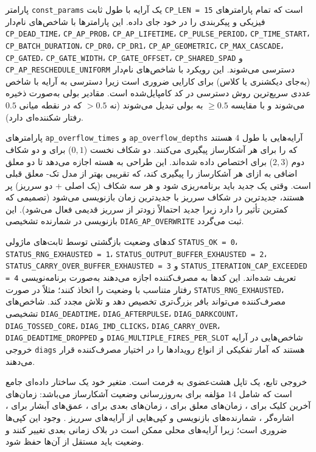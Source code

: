 پارامتر \texttt{const\_params} یک آرایه  با طول ثابت \texttt{CP\_LEN = 15} است که تمام پارامترهای فیزیکی و پیکربندی را در خود جای داده. این پارامترها با شاخص‌های نام‌دار \texttt{CP\_DEAD\_TIME}، \texttt{CP\_AP\_PROB}، \texttt{CP\_AP\_LIFETIME}، \texttt{CP\_PULSE\_PERIOD}، \texttt{CP\_TIME\_START}، \texttt{CP\_BATCH\_DURATION}، \texttt{CP\_DR0}، \texttt{CP\_DR1}، \texttt{CP\_AP\_GEOMETRIC}، \texttt{CP\_MAX\_CASCADE}، \texttt{CP\_GATED}، \texttt{CP\_GATE\_WIDTH}، \texttt{CP\_GATE\_OFFSET}، \texttt{CP\_SHARED\_SPAD} و \texttt{CP\_AP\_RESCHEDULE\_UNIFORM} دسترسی می‌شوند. این رویکرد با شاخص‌های نام‌دار (به‌جای دیکشنری یا کلاس) برای کارایی  ضروری است زیرا دسترسی به آرایه با شاخص عددی سریع‌ترین روش دسترسی در کد کامپایل‌شده است. مقادیر بولی به‌صورت  ذخیره می‌شوند و با مقایسه $\geq 0.5$ به بولی تبدیل می‌شوند (نه $> 0.5$ که در نقطه میانی $0.5$ رفتار شکننده‌ای دارد).

پارامترهای \texttt{ap\_overflow\_times} و \texttt{ap\_overflow\_depths} آرایه‌هایی با طول $4$ هستند که  را برای هر آشکارساز پیگیری می‌کنند. دو شکاف نخست ($0, 1$) برای  و دو شکاف دوم ($2, 3$) برای  اختصاص داده شده‌اند. این طراحی به هسته اجازه می‌دهد تا دو  معلق اضافی به ازای هر آشکارساز را پیگیری کند، که تقریبی بهتر از مدل تک- معلق قبلی است. وقتی یک  جدید باید برنامه‌ریزی شود و هر سه شکاف (یک اصلی + دو سرریز) پر هستند، جدیدترین  در شکاف سرریز با جدیدترین زمان بازنویسی می‌شود (تصمیمی که کمترین تأثیر را دارد زیرا  جدید احتمالاً زودتر از  سرریز قدیمی فعال می‌شود). این بازنویسی در شمارنده تشخیصی \texttt{DIAG\_AP\_OVERWRITE} ثبت می‌گردد.

کدهای وضعیت بازگشتی توسط ثابت‌های ماژولی \texttt{STATUS\_OK = 0}، \texttt{STATUS\_RNG\_EXHAUSTED = 1}، \texttt{STATUS\_OUTPUT\_BUFFER\_EXHAUSTED = 2}، \texttt{STATUS\_CARRY\_OVER\_BUFFER\_EXHAUSTED = 3} و \texttt{STATUS\_ITERATION\_CAP\_EXCEEDED = 4} تعریف شده‌اند. این کدها به مصرف‌کننده اجازه می‌دهند به‌صورت برنامه‌نویسی رفتار متناسب با وضعیت را اتخاذ کنند؛ مثلاً در صورت \texttt{STATUS\_RNG\_EXHAUSTED}، مصرف‌کننده می‌تواند بافر  بزرگ‌تری تخصیص دهد و تلاش مجدد کند. شاخص‌های تشخیصی \texttt{DIAG\_DEADTIME}، \texttt{DIAG\_AFTERPULSE}، \texttt{DIAG\_DARKCOUNT}، \texttt{DIAG\_TOSSED\_CORE}، \texttt{DIAG\_IMD\_CLICKS}، \texttt{DIAG\_CARRY\_OVER}، \texttt{DIAG\_DEADTIME\_DROPPED} و \texttt{DIAG\_MULTIPLE\_FIRES\_PER\_SLOT} شاخص‌هایی در آرایه خروجی \texttt{diags} هستند که آمار تفکیکی از انواع رویدادها را در اختیار مصرف‌کننده قرار می‌دهند.

خروجی تابع، یک تاپل هشت‌عضوی به فرمت  است. متغیر  خود یک ساختار داده‌ای جامع است که شامل $14$ مؤلفه برای به‌روزرسانی وضعیت آشکارساز می‌باشد: زمان‌های آخرین کلیک برای ، زمان‌های  معلق برای ، زمان‌های  بعدی برای ، عمق‌های آبشار برای ، اشاره‌گر ، شمارنده‌های بازنویسی  و کپی‌هایی از آرایه‌های سرریز . وجود این کپی‌ها ضروری است؛ زیرا آرایه‌های محلی ممکن است در بلاک زمانی بعدی تغییر کنند و وضعیت باید مستقل از آن‌ها حفظ شود.

